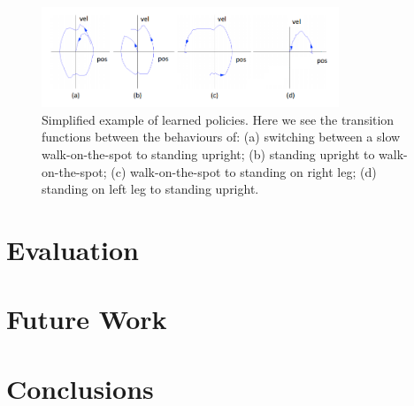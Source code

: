 \begin{figure}[!t]
\centering
\includegraphics[width=3.5in]{img/RL_policies.png}
\caption{Simplified example of learned policies. Here we see the transition functions between the behaviours of: (a) switching between a slow walk-on-the-spot to standing upright; (b) standing upright to walk-on-the-spot; (c) walk-on-the-spot to standing on right leg; (d) standing on left leg to standing upright.}
\label{fig:policy}
\end{figure}


\section{Evaluation}
\section{Future Work}
\section{Conclusions}
